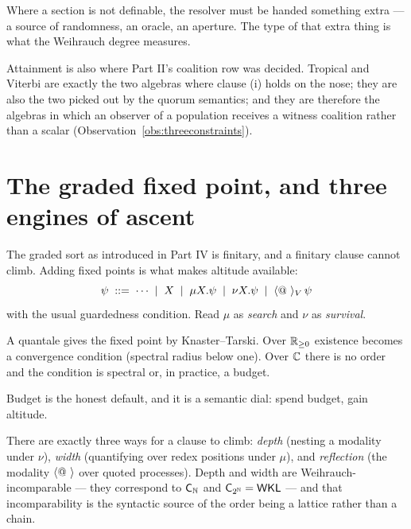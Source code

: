 \begin{principle}
\label{prin:lift}
Where a section is not definable, the resolver must be handed something extra ---
a source of randomness, an oracle, an aperture. The type of that extra thing is
what the Weihrauch degree measures.
\end{principle}

Attainment is also where Part II's coalition row was decided. Tropical and Viterbi
are exactly the two algebras where clause (i) holds on the nose; they are also the
two picked out by the quorum semantics; and they are therefore the algebras in
which an observer of a population receives a witness coalition rather than a
scalar (Observation~\ref{obs:threeconstraints}).

\section{The graded fixed point, and three engines of ascent}
\label{sec:engines}

The graded sort as introduced in Part IV is finitary, and a finitary clause cannot
climb. Adding fixed points is what makes altitude available:
\[
  \psi \;::=\; \cdots \;\mid\; X \;\mid\; \mu X.\psi \;\mid\; \nu X.\psi
  \;\mid\; \langle @\  \rangle_{V}\, \psi
\]
with the usual guardedness condition. Read $\mu$ as \emph{search} and $\nu$ as
\emph{survival}.

\begin{proposition}
\label{prop:fpexist}
A quantale gives the fixed point by Knaster--Tarski. Over $\mathbb{R}_{\ge0}$ existence
becomes a convergence condition (spectral radius below one). Over $\mathbb{C}$ there is
no order and the condition is spectral or, in practice, a budget.
\end{proposition}

Budget is the honest default, and it is a semantic dial: spend budget, gain
altitude.

\begin{proposition}
\label{prop:engines}
There are exactly three ways for a clause to climb: \emph{depth} (nesting a
modality under $\nu$), \emph{width} (quantifying over redex positions under
$\mu$), and \emph{reflection} (the modality $\langle @\ \rangle$ over quoted
processes). Depth and width are Weihrauch-incomparable --- they correspond to
$\mathsf{C}_{\mathbb{N}}$ and $\mathsf{C}_{2^{\mathbb{N}}} = \mathsf{WKL}$ --- and that
incomparability is the syntactic source of the order being a lattice rather than a
chain.
\end{proposition}

